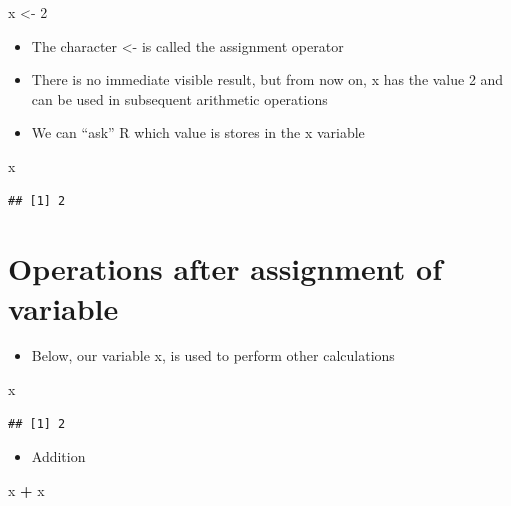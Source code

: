 \documentclass[
]{book}
\newenvironment{Shaded}{\begin{snugshade}}{\end{snugshade}}
\newcommand{\DecValTok}[1]{\textcolor[rgb]{0.00,0.00,0.81}{#1}}
\newcommand{\NormalTok}[1]{#1}
\newcommand{\OtherTok}[1]{\textcolor[rgb]{0.56,0.35,0.01}{#1}}
\newcommand{\SpecialCharTok}[1]{\textcolor[rgb]{0.81,0.36,0.00}{\textbf{#1}}}
\providecommand{\tightlist}{%
  \setlength{\itemsep}{0pt}\setlength{\parskip}{0pt}}
\begin{document}
\begin{Shaded}
\begin{Highlighting}[]
\NormalTok{x }\OtherTok{\textless{}{-}} \DecValTok{2}
\end{Highlighting}
\end{Shaded}

\begin{itemize}
\item
  The character \textless- is called the assignment operator
\item
  There is no immediate visible result, but from now on, x has the value 2 and can be used in subsequent arithmetic operations
\item
  We can ``ask'' R which value is stores in the x variable
\end{itemize}

\begin{Shaded}
\begin{Highlighting}[]
\NormalTok{x}
\end{Highlighting}
\end{Shaded}

\begin{verbatim}
## [1] 2
\end{verbatim}

\section{Operations after assignment of variable}\label{operations-after-assignment-of-variable}

\begin{itemize}
\tightlist
\item
  Below, our variable x, is used to perform other calculations
\end{itemize}

\begin{Shaded}
\begin{Highlighting}[]
\NormalTok{x}
\end{Highlighting}
\end{Shaded}

\begin{verbatim}
## [1] 2
\end{verbatim}

\begin{itemize}
\tightlist
\item
  Addition
\end{itemize}

\begin{Shaded}
\begin{Highlighting}[]
\NormalTok{x }\SpecialCharTok{+}\NormalTok{ x}
\end{Highlighting}
\end{Shaded}
\end{document}

